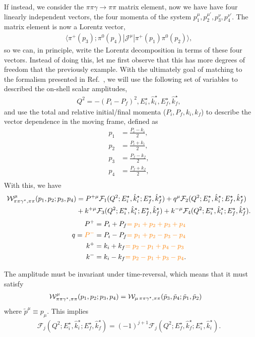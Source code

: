 If instead, we consider the $\pi\pi\gamma\to\pi\pi$ matrix element, now we have have four linearly independent vectors, the four momenta of the system $p^{\mu}_{1},p^{\mu'}_{2},p^{\nu}_{3},p^{\nu'}_{4}$. The matrix element is now a Lorentz vector,
\begin{align}
\langle\pi^+(p_3);\pi^0(p_4)|{\mathcal{J}}^{\mu}|\pi^+(p_1)\pi^0(p_2)\rangle,
\end{align}
so we can, in principle, write the Lorentz decomposition in terms of these four vectors. Instead of doing this, let me first observe that this has more degrees of freedom that the previously example. With the ultimately goal of matching to the formalism presented in Ref.~\cite{Briceno:2015tza}, we will use the following set of variables to described the on-shell scalar amplitudes,
\begin{align}
Q^2=-(P_i-P_f)^2,E_i^\star,\hat{k}^\star_i,E_f^\star,\hat{k}^\star_f,
\end{align} 
and use the total and relative initial/final momenta ($P_i,P_f,k_i,k_f$) to describe the vector dependence in the moving frame, defined as
\begin{align}
p_1&=\frac{P_i-k_i}{2},\\
p_2&=\frac{P_i+k_i}{2},\\
p_3&=\frac{P_f-k_f}{2},\\
p_4&=\frac{P_f+k_f}{2},\\
\end{align}
With this, we have
\begin{align}
{\mathcal{W}}^{\mu}_{\pi\pi\gamma^\star,\pi\pi}(p_1,p_2;p_3,p_4)&=
P^{+\mu}\mathcal{F}_{1}(Q^2;E_i^\star,\hat{k}^\star_i;E_f^\star,\hat{k}^\star_f)
+
q^{\mu}\mathcal{F}_{2}(Q^2;E_i^\star,\hat{k}_i^\star;E_f^\star,\hat{k}^\star_f)
\nonumber\\
&+
k^{+\mu}\mathcal{F}_{3}(Q^2;E_i^\star,\hat{k}_i^\star;E_f^\star,\hat{k}_f^\star)
+
k^{-\mu}\mathcal{F}_{4}(Q^2;E_i^\star,\hat{k}_i^\star;E_f^\star,\hat{k}_f^\star).
\end{align}
\begin{align}
P^+&=P_i+P_f{\color{orange} =p_1+p_2+p_3+p_4}\\
q={\color{orange} P^-}&=P_i-P_f{\color{orange} =p_1+p_2-p_3-p_4}\\
k^+&=k_i+k_f{\color{orange} =p_2-p_1+p_4-p_3}\\
k^-&=k_i-k_f{\color{orange} =p_2-p_1+p_3-p_4}.
\end{align}

The amplitude must be invariant under time-reversal, which means that it must satisfy
\begin{align}
{\mathcal{W}}^{\mu}_{\pi\pi\gamma^\star,\pi\pi}(p_1,p_2;p_3,p_4)&=
{\mathcal{W}}_{\mu\,\pi\pi\gamma^\star,\pi\pi}(\tilde{p}_3,\tilde{p}_4;\tilde{p}_1,\tilde{p}_2)
\end{align}
where $\tilde{p}^\mu\equiv {p}_\mu$. This implies
\begin{align}
\mathcal{F}_{j}(Q^2;E_i^\star,\hat{k}_i^\star;E_f^\star,\hat{k}_f^\star)
=(-1)^{j+1}\mathcal{F}_{j}(Q^2;E_f^\star,\hat{k}_f^\star;E_i^\star,\hat{k}_i^\star).
\end{align}

